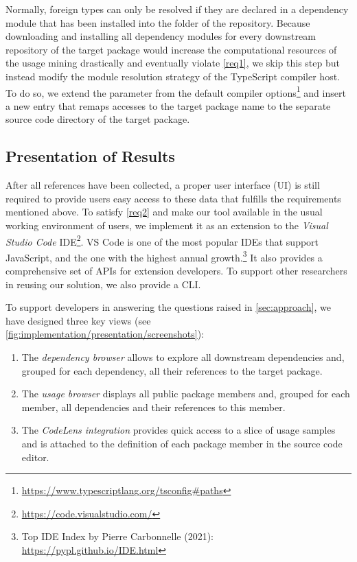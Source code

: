 Normally, foreign types can only be resolved if they are declared in a dependency module that has been installed into the  folder of the repository.
Because downloading and installing all dependency modules for every downstream repository of the target package would increase the computational resources of the usage mining drastically and eventually violate \cref{req1}, we skip this step but instead modify the module resolution strategy of the TypeScript compiler host.
To do so, we extend the  parameter from the default compiler options\footnote{\url{https://www.typescriptlang.org/tsconfig\#paths}} and insert a new entry that remaps accesses to the target package name to the separate source code directory of the target package.

\subsection{Presentation of Results}
\label{sec:implementation/presentation}

After all references have been collected, a proper user interface (UI) is still required to provide users easy access to these data that fulfills the requirements mentioned above.
To satisfy \cref{req2} and make our tool available in the usual working environment of users, we implement it as an extension to the \emph{Visual Studio Code} IDE\footnote{\url{https://code.visualstudio.com/}}.
VS Code is one of the most popular IDEs that support JavaScript, and the one with the highest annual growth.\footnote{Top IDE Index by Pierre Carbonnelle (2021): \url{https://pypl.github.io/IDE.html}}
It also provides a comprehensive set of APIs for extension developers.
To support other researchers in reusing our solution, we also provide a CLI.

To support developers in answering the questions raised in \cref{sec:approach}, we have designed three key views (see \cref{fig:implementation/presentation/screenshots}):

\begin{enumerate}[label=(\roman*)]
	\item The \emph{dependency browser} allows to explore all downstream dependencies and, grouped for each dependency, all their references to the target package.
	\item The \emph{usage browser} displays all public package members and, grouped for each member, all dependencies and their references to this member.
	\item The \emph{CodeLens integration} provides quick access to a slice of usage samples and is attached to the definition of each package member in the source code editor.
\end{enumerate}

